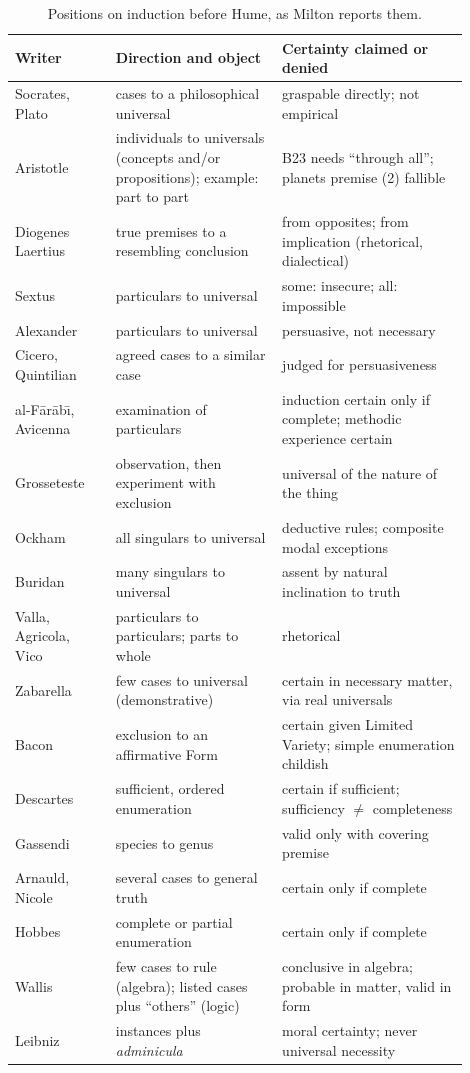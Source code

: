 \begin{table}[ht]
\centering
\small
\begin{tabular}{p{0.2\linewidth}p{0.33\linewidth}p{0.37\linewidth}}
\hline
Writer & Direction and object & Certainty claimed or denied\\
\hline
Socrates, Plato & cases to a philosophical universal & graspable directly; not empirical\\
Aristotle & individuals to universals (concepts and/or propositions); example: part to part & B23 needs ``through all''; planets premise (2) fallible\\
Diogenes Laertius & true premises to a resembling conclusion & from opposites; from implication (rhetorical, dialectical)\\
Sextus & particulars to universal & some: insecure; all: impossible\\
Alexander & particulars to universal & persuasive, not necessary\\
Cicero, Quintilian & agreed cases to a similar case & judged for persuasiveness\\
al-F\={a}r\={a}b\={\i}, Avicenna & examination of particulars & induction certain only if complete; methodic experience certain\\
Grosseteste & observation, then experiment with exclusion & universal of the nature of the thing\\
Ockham & all singulars to universal & deductive rules; composite modal exceptions\\
Buridan & many singulars to universal & assent by natural inclination to truth\\
Valla, Agricola, Vico & particulars to particulars; parts to whole & rhetorical\\
Zabarella & few cases to universal (demonstrative) & certain in necessary matter, via real universals\\
Bacon & exclusion to an affirmative Form & certain given Limited Variety; simple enumeration childish\\
Descartes & sufficient, ordered enumeration & certain if sufficient; sufficiency $\neq$ completeness\\
Gassendi & species to genus & valid only with covering premise\\
Arnauld, Nicole & several cases to general truth & certain only if complete\\
Hobbes & complete or partial enumeration & certain only if complete\\
Wallis & few cases to rule (algebra); listed cases plus ``others'' (logic) & conclusive in algebra; probable in matter, valid in form\\
Leibniz & instances plus \emph{adminicula} & moral certainty; never universal necessity\\
\hline
\end{tabular}
\caption{Positions on induction before Hume, as Milton reports them.}
\label{tab:p15-w02b-p15-026-comparison}
\end{table}

